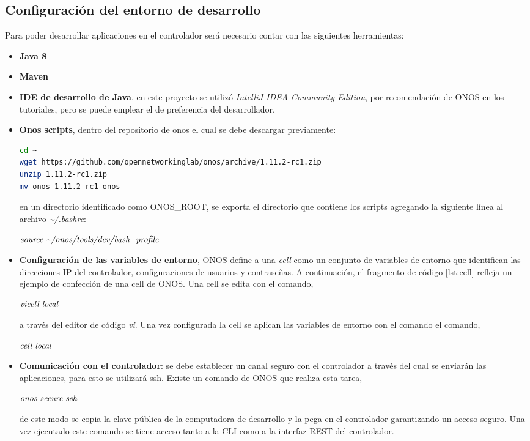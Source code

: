 \subsection{Configuración del entorno de desarrollo}
Para poder desarrollar aplicaciones en el controlador será necesario contar con las siguientes herramientas:
\begin{itemize}
    \item \textbf{Java 8}
    \item \textbf{Maven}
    \item \textbf{IDE de desarrollo de Java}, en este proyecto se utilizó \textit{IntelliJ IDEA Community Edition}, por recomendación de ONOS en los tutoriales, pero se puede emplear el de preferencia del desarrollador.
    \item \textbf{Onos scripts}, dentro del repositorio de onos \parencite{onos-repo} el cual se debe descargar previamente:

\begin{lstlisting}[caption={}, captionpos=b, label={}, language=bash]
cd ~
wget https://github.com/opennetworkinglab/onos/archive/1.11.2-rc1.zip
unzip 1.11.2-rc1.zip
mv onos-1.11.2-rc1 onos        
\end{lstlisting}

    en un directorio identificado como ONOS\_ROOT, se exporta el directorio que contiene los scripts agregando la siguiente línea al archivo \textit{\textasciitilde/.bashrc}:
    \begin{center}
        $ \emph {source \textasciitilde/onos/tools/dev/bash\_profile}$
    \end{center}
    \item \textbf{Configuración de las variables de entorno}, ONOS define a una \textit{cell} como un conjunto de variables de entorno que identifican las direcciones IP del controlador, configuraciones de usuarios y contraseñas. A continuación, el fragmento de código \ref{lst:cell} refleja un ejemplo de confección de una cell de ONOS. Una cell se edita con el comando,
    \begin{center}
        $ \emph {vicell local}$
    \end{center}
    a través del editor de código \textit{vi}. Una vez configurada la cell se aplican las variables de entorno con el comando el comando,
    \begin{center}
        $ \emph {cell local}$
    \end{center}
    \item \textbf{Comunicación con el controlador}: se debe establecer un canal seguro con el controlador a través del cual se enviarán las aplicaciones, para esto se utilizará ssh. Existe un comando de ONOS que realiza esta tarea,
    \begin{center}
        $ \emph {onos-secure-ssh}$
    \end{center}
    de este modo se copia la clave pública de la computadora de desarrollo y la pega en el controlador garantizando un acceso seguro. Una vez ejecutado este comando se tiene acceso tanto a la CLI como a la interfaz REST del controlador.
\end{itemize}

